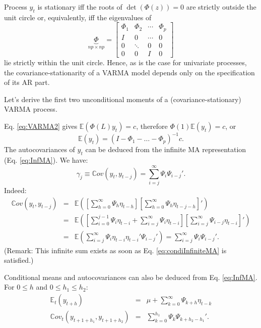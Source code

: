 \documentclass[
  12pt,
]{book}
\theoremstyle{definition}
\theoremstyle{definition}
\theoremstyle{definition}
\theoremstyle{definition}
\theoremstyle{remark}
\begin{document}
Process \(y_t\) is stationary iff the roots of \(\det(\Phi(z))=0\) are strictly outside the unit circle or, equivalently, iff the eigenvalues of
\begin{equation}
\underbrace{\Phi}_{np \times np} = \left[\begin{array}{cccc}
\Phi_{1} & \Phi_{2} & \cdots & \Phi_{p}\\
I & 0 & \cdots & 0\\
0 & \ddots & 0 & 0\\
0 & 0 & I & 0\end{array}\right]
\label{eq:matrixPHI}
\end{equation}
lie strictly within the unit circle. Hence, as is the case for univariate processes, the covariance-stationarity of a VARMA model depends only on the specification of its AR part.

Let's derive the first two unconditional moments of a (covariance-stationary) VARMA process.

Eq. \eqref{eq:VARMA2} gives \(\mathbb{E}(\Phi(L)y_t)=c\), therefore \(\Phi(1)\mathbb{E}(y_t)=c\), or
\[
\mathbb{E}(y_t) = (I - \Phi_1 - \dots - \Phi_p)^{-1}c.
\]
The autocovariances of \(y_t\) can be deduced from the infinite MA representation (Eq. \eqref{eq:InfMA}). We have:
\[
\gamma_j \equiv \mathbb{C}ov(y_t,y_{t-j}) = \sum_{i=j}^\infty \Psi_i \Psi_{i-j}'.
\]
Indeed:
\begin{eqnarray*}
\mathbb{C}ov(y_t,y_{t-j}) &=& \mathbb{E}\left(\left[\sum_{h=0}^\infty \Psi_{h} \eta_{t-h}\right]\left[\sum_{h=0}^\infty \Psi_{h} \eta_{t-j-h}\right]'\right)\\
&=& \mathbb{E}\left(\left[\sum_{i=0}^{j-1} \Psi_{i} \eta_{t-i}+\sum_{i=j}^\infty \Psi_{i} \eta_{t-i}\right]\left[\sum_{i=j}^\infty \Psi_{i-j} \eta_{t-i}\right]'\right)\\
&=&\mathbb{E}\left(\sum_{i=j}^\infty \Psi_{i} \eta_{t-i}\eta_{t-i}'\Psi_{i-j}'\right)= \sum_{i=j}^\infty \Psi_i \Psi_{i-j}'.
\end{eqnarray*}
(Remark: This infinite sum exists as soon as Eq. \eqref{eq:condiInfiniteMA} is satisfied.)

Conditional means and autocovariances can also be deduced from Eq. \eqref{eq:InfMA}. For \(0 \le h\) and \(0 \le h_1 \le h_2\):
\begin{eqnarray*}
\mathbb{E}_t(y_{t+h}) &=& \mu + \sum_{k=0}^\infty \Psi_{k+h} \eta_{t-k} \\
\mathbb{C}ov_t(y_{t+1+h_1},y_{t+1+h_2}) &=& \sum_{k=0}^{h_1} \Psi_{k}\Psi_{k+h_2-h_1}'.
\end{eqnarray*}
\end{document}
